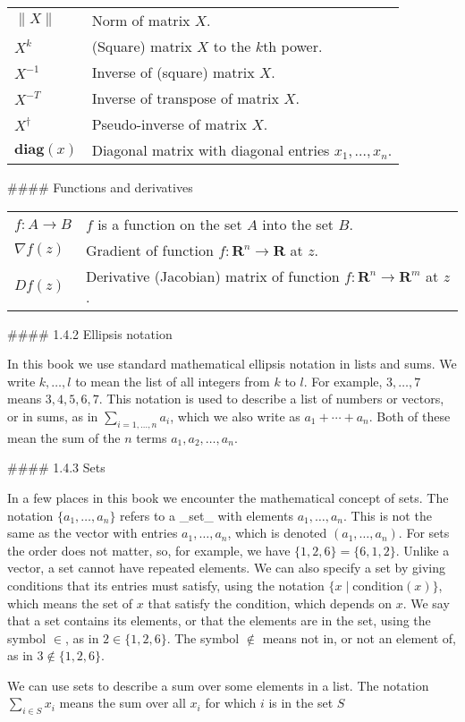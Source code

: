 

\begin{tabular}{l l} \(\|X\|\) & Norm of matrix \(X\). \\ \(X^{k}\) & (Square) matrix \(X\) to the \(k\)th power. \\ \(X^{-1}\) & Inverse of (square) matrix \(X\). \\ \(X^{-T}\) & Inverse of transpose of matrix \(X\). \\ \(X^{\dagger}\) & Pseudo-inverse of matrix \(X\). \\ \(\mathbf{diag}(x)\) & Diagonal matrix with diagonal entries \(x_{1},\ldots,x_{n}\). \\ \end{tabular}

#### Functions and derivatives

\begin{tabular}{l l} \(f:A\to B\) & \(f\) is a function on the set \(A\) into the set \(B\). \\ \(\nabla f(z)\) & Gradient of function \(f:\mathbf{R}^{n}\to\mathbf{R}\) at \(z\). \\ \(Df(z)\) & Derivative (Jacobian) matrix of function \(f:\mathbf{R}^{n}\to\mathbf{R}^{m}\) at \(z\). \\ \end{tabular}

#### 1.4.2 Ellipsis notation

In this book we use standard mathematical ellipsis notation in lists and sums. We write \(k,\ldots,l\) to mean the list of all integers from \(k\) to \(l\). For example, \(3,\ldots,7\) means \(3,4,5,6,7\). This notation is used to describe a list of numbers or vectors, or in sums, as in \(\sum_{i=1,\ldots,n}a_{i}\), which we also write as \(a_{1}+\cdots+a_{n}\). Both of these mean the sum of the \(n\) terms \(a_{1},a_{2},\ldots,a_{n}\).

#### 1.4.3 Sets

In a few places in this book we encounter the mathematical concept of sets. The notation \(\{a_{1},\ldots,a_{n}\}\) refers to a _set_ with elements \(a_{1},\ldots,a_{n}\). This is not the same as the vector with entries \(a_{1},\ldots,a_{n}\), which is denoted \((a_{1},\ldots,a_{n})\). For sets the order does not matter, so, for example, we have \(\{1,2,6\}=\{6,1,2\}\). Unlike a vector, a set cannot have repeated elements. We can also specify a set by giving conditions that its entries must satisfy, using the notation \(\{x\mid\text{condition}(x)\}\), which means the set of \(x\) that satisfy the condition, which depends on \(x\). We say that a set contains its elements, or that the elements are in the set, using the symbol \(\in\), as in \(2\in\{1,2,6\}\). The symbol \(\not\in\) means not in, or not an element of, as in \(3\not\in\{1,2,6\}\).

We can use sets to describe a sum over some elements in a list. The notation \(\sum_{i\in S}x_{i}\) means the sum over all \(x_{i}\) for which \(i\) is in the set \(S\)
